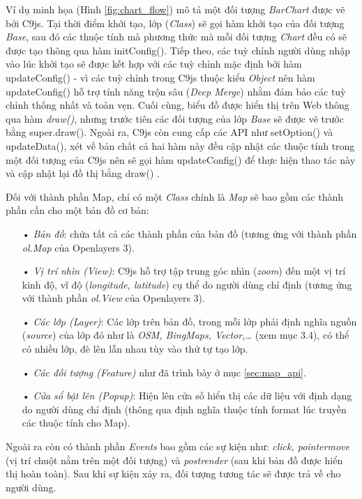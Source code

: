 \documentclass[12pt,a4paper,twoside]{article}
\begin{document}
Ví dụ minh họa (Hình \ref{fig:chart_flow}) mô tả một đối tượng \textit{BarChart} được vẽ bởi C9js. Tại thời điểm khởi tạo, lớp (\textit{Class}) sẽ gọi hàm khởi tạo của đối tượng \textit{Base}, sau đó các thuộc tính mà phương thức mà mỗi đối tượng \textit{Chart} đều có sẽ được tạo thông qua hàm \textsf{initConfig()}. Tiếp theo, các tuỳ chỉnh người dùng nhập vào lúc khởi tạo sẽ được kết hợp với các tuỳ chỉnh mặc định bởi hàm \textsf{updateConfig()} - vì các tuỳ chỉnh trong C9js thuộc kiểu \textit{Object} nên hàm \textsf{updateConfig()} hỗ trợ tính năng trộn sâu (\textit{Deep Merge})\cite{merge_deep} nhằm đảm bảo các tuỳ chỉnh thống nhất và toàn vẹn. Cuối cùng, biểu đồ được hiển thị trên Web thông qua hàm \textit{draw()}, nhưng trước tiên các đối tượng của lớp \textit{Base} sẽ được vẽ trước bằng \textsf{super.draw()}. Ngoài ra, C9js còn cung cấp các API như \textsf{setOption()} và \textsf{updateData()}, xét về bản chất cả hai hàm này đều cập nhật các thuộc tính trong một đối tượng của C9js nên sẽ gọi hàm \textsf{updateConfig()} để thực hiện thao tác này và cập nhật lại đồ thị bằng \textsf{draw()} .

Đối với thành phần Map, chỉ có một \textit{Class} chính là \textit{Map} sẽ bao gồm các thành phần cần cho một bản đồ cơ bản:
\begin{itemize}
\item[•] \emph{Bản đồ}: chứa tất cả các thành phần của bản đồ (tương ứng với thành phần \textit{ol.Map} của Openlayers 3).
\item[•] \emph{Vị trí nhìn (View)}: C9js hỗ trợ tập trung góc nhìn (\textit{zoom}) đến một vị trí kinh độ, vĩ độ (\textit{longitude, latitude}) cụ thể do người dùng chỉ định (tương ứng với thành phần \textit{ol.View} của Openlayers 3).
\item[•] \emph{Các lớp (Layer)}: Các lớp trên bản đồ, trong mỗi lớp phải định nghĩa nguồn (\textit{source}) của lớp đó như là \textit{OSM, BingMaps, Vector,…} (xem mục 3.4), có thể có nhiều lớp, đè lên lẫn nhau tùy vào thứ tự tạo lớp.
\item[•] \emph{Các đối tượng (Feature)} như đã trình bày ở mục \ref{sec:map_api}.
\item[•] \emph{Cửa sổ bật lên (Popup)}: Hiện lên cửa số hiển thị các dữ liệu với định dạng do người dùng chỉ định (thông qua định nghĩa thuộc tính format lúc truyền các thuộc tính cho Map).
\end{itemize}

Ngoài ra còn có thành phần \textit{Events} bao gồm các sự kiện như: \textit{click, pointermove} (vị trí chuột nằm trên một đối tượng) và \textit{postrender} (sau khi bản đồ được hiển thị hoàn toàn). Sau khi sự kiện xảy ra, đối tượng tương tác sẽ được trả về cho người dùng.
\end{document}
